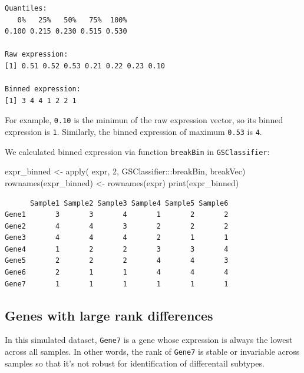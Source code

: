 \documentclass[
]{book}
\newenvironment{Shaded}{\begin{snugshade}}{\end{snugshade}}
\newcommand{\DecValTok}[1]{\textcolor[rgb]{0.00,0.00,0.81}{#1}}
\newcommand{\FunctionTok}[1]{\textcolor[rgb]{0.00,0.00,0.00}{#1}}
\newcommand{\NormalTok}[1]{#1}
\newcommand{\OtherTok}[1]{\textcolor[rgb]{0.56,0.35,0.01}{#1}}
\newcommand{\SpecialCharTok}[1]{\textcolor[rgb]{0.00,0.00,0.00}{#1}}
\begin{document}
\begin{verbatim}
Quantiles: 
   0%   25%   50%   75%  100% 
0.100 0.215 0.230 0.515 0.530 

Raw expression: 
[1] 0.51 0.52 0.53 0.21 0.22 0.23 0.10

Binned expression: 
[1] 3 4 4 1 2 2 1
\end{verbatim}

For example, \texttt{0.10} is the minimun of the raw expression vector, so its binned expression is \texttt{1}. Similarly, the binned expression of maximum \texttt{0.53} is \texttt{4}.

We calculated binned expression via function \texttt{breakBin} in \texttt{GSClassifier}:

\begin{Shaded}
\begin{Highlighting}[]
\NormalTok{expr\_binned }\OtherTok{\textless{}{-}} \FunctionTok{apply}\NormalTok{(}
\NormalTok{  expr, }\DecValTok{2}\NormalTok{, }
\NormalTok{  GSClassifier}\SpecialCharTok{:::}\NormalTok{breakBin,}
\NormalTok{  breakVec)}
\FunctionTok{rownames}\NormalTok{(expr\_binned) }\OtherTok{\textless{}{-}} \FunctionTok{rownames}\NormalTok{(expr)}
\FunctionTok{print}\NormalTok{(expr\_binned)}
\end{Highlighting}
\end{Shaded}

\begin{verbatim}
      Sample1 Sample2 Sample3 Sample4 Sample5 Sample6
Gene1       3       3       4       1       2       2
Gene2       4       4       3       2       2       2
Gene3       4       4       4       2       1       1
Gene4       1       2       2       3       3       4
Gene5       2       2       2       4       4       3
Gene6       2       1       1       4       4       4
Gene7       1       1       1       1       1       1
\end{verbatim}

\hypertarget{genes-with-large-rank-differences}{%
\subsection{Genes with large rank differences}\label{genes-with-large-rank-differences}}

In this simulated dataset, \texttt{Gene7} is a gene whose expression is always the lowest across all samples. In other words, the rank of \texttt{Gene7} is stable or invariable across samples so that it's not robust for identification of differentail subtypes.
\end{document}
